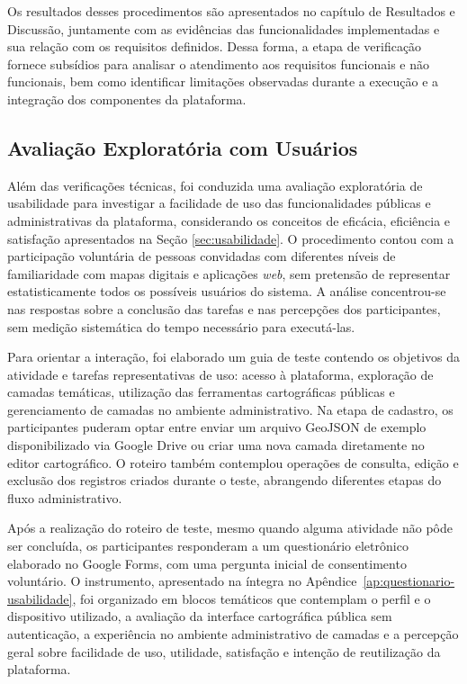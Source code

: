 Os resultados desses procedimentos são apresentados no capítulo de Resultados e Discussão, juntamente com as evidências das funcionalidades implementadas e sua relação com os requisitos definidos. Dessa forma, a etapa de verificação fornece subsídios para analisar o atendimento aos requisitos funcionais e não funcionais, bem como identificar limitações observadas durante a execução e a integração dos componentes da plataforma.

\FloatBarrier
\subsection{Avaliação Exploratória com Usuários}
\label{sec:avaliacao-usuarios-metodologia}

Além das verificações técnicas, foi conduzida uma avaliação exploratória de usabilidade para investigar a facilidade de uso das funcionalidades públicas e administrativas da plataforma, considerando os conceitos de eficácia, eficiência e satisfação apresentados na Seção \ref{sec:usabilidade}. O procedimento contou com a participação voluntária de pessoas convidadas com diferentes níveis de familiaridade com mapas digitais e aplicações \textit{web}, sem pretensão de representar estatisticamente todos os possíveis usuários do sistema. A análise concentrou-se nas respostas sobre a conclusão das tarefas e nas percepções dos participantes, sem medição sistemática do tempo necessário para executá-las.

Para orientar a interação, foi elaborado um guia de teste contendo os objetivos da atividade e tarefas representativas de uso: acesso à plataforma, exploração de camadas temáticas, utilização das ferramentas cartográficas públicas e gerenciamento de camadas no ambiente administrativo. Na etapa de cadastro, os participantes puderam optar entre enviar um arquivo GeoJSON de exemplo disponibilizado via Google Drive ou criar uma nova camada diretamente no editor cartográfico. O roteiro também contemplou operações de consulta, edição e exclusão dos registros criados durante o teste, abrangendo diferentes etapas do fluxo administrativo.

Após a realização do roteiro de teste, mesmo quando alguma atividade não pôde ser concluída, os participantes responderam a um questionário eletrônico elaborado no Google Forms, com uma pergunta inicial de consentimento voluntário. O instrumento, apresentado na íntegra no Apêndice~\ref{ap:questionario-usabilidade}, foi organizado em blocos temáticos que contemplam o perfil e o dispositivo utilizado, a avaliação da interface cartográfica pública sem autenticação, a experiência no ambiente administrativo de camadas e a percepção geral sobre facilidade de uso, utilidade, satisfação e intenção de reutilização da plataforma.

